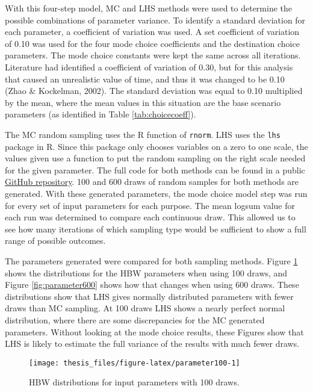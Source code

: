 \documentclass[fancy, masters,twoside]{byuthesis}
\begin{document}
With this four-step model, MC and LHS methods were used to determine the possible combinations of parameter variance. To identify a standard deviation for each parameter, a coefficient of variation was used. A set coefficient of variation of 0.10 was used for the four mode choice coefficients and the destination choice parameters. The mode choice constants were kept the same across all iterations. Literature had identified a coefficient of variation of 0.30, but for this analysis that caused an unrealistic value of time, and thus it was changed to be 0.10 (Zhao \& Kockelman, 2002). The standard deviation was equal to 0.10 multiplied by the mean, where the mean values in this situation are the base scenario parameters (as identified in Table \ref{tab:choicecoeff}).

The MC random sampling uses the R function of \texttt{rnorm}. LHS uses the \texttt{lhs} package in R. Since this package only chooses variables on a zero to one scale, the values given use a function to put the random sampling on the right scale needed for the given parameter. The full code for both methods can be found in a public \href{https://github.com/natmaegray/sensitivity_thesis}{GitHub repository}. 100 and 600 draws of random samples for both methods are generated. With these generated parameters, the mode choice model step was run for every set of input parameters for each purpose. The mean logsum value for each run was determined to compare each continuous draw. This allowed us to see how many iterations of which sampling type would be sufficient to show a full range of possible outcomes.

The parameters generated were compared for both sampling methods. Figure \ref{fig:parameter100} shows the distributions for the HBW parameters when using 100 draws, and Figure \ref{fig:parameter600} shows how that changes when using 600 draws. These distributions show that LHS gives normally distributed parameters with fewer draws than MC sampling. At 100 draws LHS shows a nearly perfect normal distribution, where there are some discrepancies for the MC generated parameters. Without looking at the mode choice results, these Figures show that LHS is likely to estimate the full variance of the results with much fewer draws.

\begin{figure}

{\centering \texttt{[image: thesis\_files/figure-latex/parameter100-1]} 

}

\caption{HBW distributions for input parameters with 100 draws.}\label{fig:parameter100}
\end{figure}
\end{document}
